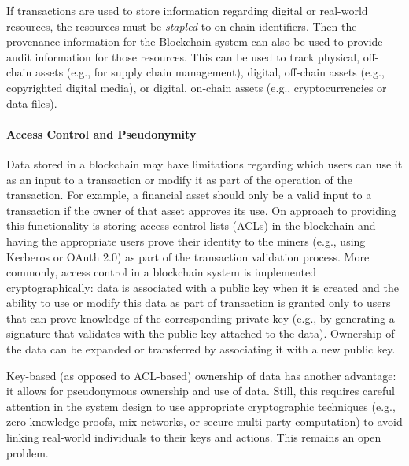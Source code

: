 If transactions are used to store information regarding digital or real-world resources, the resources must be \emph{stapled} to on-chain identifiers. Then the provenance information for the Blockchain system can also be used to provide audit information for those resources.
This can be used to track physical, off-chain assets (e.g., for supply chain management), digital, off-chain assets (e.g., copyrighted digital media), or digital, on-chain assets (e.g., cryptocurrencies or data files).
 
\paragraph{Access Control and Pseudonymity}
Data stored in a blockchain may have limitations regarding which users can use it as an input to a transaction or modify it as part of the operation of the transaction.
For example, a financial asset should only be a valid input to a transaction if the owner of that asset approves its use.
On approach to providing this functionality is storing access control lists (ACLs) in the blockchain and having the appropriate users prove their identity to the miners (e.g., using Kerberos or OAuth 2.0) as part of the transaction validation process.
More commonly, access control in a blockchain system is implemented cryptographically: data is associated with a public key when it is created and the ability to use or modify this data as part of transaction is granted only to users that can prove knowledge of the corresponding private key (e.g., by generating a signature that validates with the public key attached to the data).
Ownership of the data can be expanded or transferred by associating it with a new public key.


Key-based (as opposed to ACL-based) ownership of data has another advantage: it allows for pseudonymous ownership and use of data.
Still, this requires careful attention in the system design to use appropriate cryptographic techniques (e.g., zero-knowledge proofs, mix networks, or secure multi-party computation) to avoid linking real-world individuals to their keys and actions. This remains an open problem.

